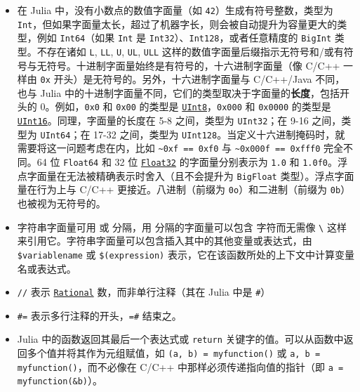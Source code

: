 \begin{itemize}
\item 在 Julia 中，没有小数点的数值字面量（如 \texttt{42}）生成有符号整数，类型为 \texttt{Int}，但如果字面量太长，超过了机器字长，则会被自动提升为容量更大的类型，例如 \texttt{Int64}（如果 \texttt{Int} 是 \texttt{Int32}）、\texttt{Int128}，或者任意精度的 \texttt{BigInt} 类型。不存在诸如 \texttt{L}, \texttt{LL}, \texttt{U}, \texttt{UL}, \texttt{ULL} 这样的数值字面量后缀指示无符号和/或有符号与无符号。十进制字面量始终是有符号的，十六进制字面量（像 C/C++ 一样由 \texttt{0x} 开头）是无符号的。另外，十六进制字面量与 C/C++/Java 不同，也与 Julia 中的十进制字面量不同，它们的类型取决于字面量的\textbf{长度}，包括开头的 0。例如，\texttt{0x0} 和 \texttt{0x00} 的类型是 \hyperlink{6609065134969660118}{\texttt{UInt8}}，\texttt{0x000} 和 \texttt{0x0000} 的类型是 \hyperlink{7018610346698168012}{\texttt{UInt16}}。同理，字面量的长度在 5-8 之间，类型为 \texttt{UInt32}；在 9-16 之间，类型为 \texttt{UInt64}；在 17-32 之间，类型为 \texttt{UInt128}。当定义十六进制掩码时，就需要将这一问题考虑在内，比如 \texttt{{\textasciitilde}0xf == 0xf0} 与 \texttt{{\textasciitilde}0x000f == 0xfff0} 完全不同。64 位 \texttt{Float64} 和 32 位 \hyperlink{8101639384272933082}{\texttt{Float32}} 的字面量分别表示为 \texttt{1.0} 和 \texttt{1.0f0}。浮点字面量在无法被精确表示时舍入（且不会提升为 \texttt{BigFloat} 类型）。浮点字面量在行为上与 C/C++ 更接近。八进制（前缀为 \texttt{0o}）和二进制（前缀为 \texttt{0b}）也被视为无符号的。


\item 字符串字面量可用 \texttt{{\textquotedbl}} 或 \texttt{{\textquotedbl}{\textquotedbl}{\textquotedbl}} 分隔，用 \texttt{{\textquotedbl}{\textquotedbl}{\textquotedbl}} 分隔的字面量可以包含 \texttt{{\textquotedbl}} 字符而无需像 \texttt{{\textquotedbl}{\textbackslash}{\textquotedbl}{\textquotedbl}} 这样来引用它。字符串字面量可以包含插入其中的其他变量或表达式，由 \texttt{\$variablename} 或 \texttt{\$(expression)} 表示，它在该函数所处的上下文中计算变量名或表达式。


\item \texttt{//} 表示 \hyperlink{8304566144531167610}{\texttt{Rational}} 数，而非单行注释（其在 Julia 中是 \texttt{\#}）


\item \texttt{\#=} 表示多行注释的开头，\texttt{=\#} 结束之。


\item Julia 中的函数返回其最后一个表达式或 \texttt{return} 关键字的值。可以从函数中返回多个值并将其作为元组赋值，如 \texttt{(a, b) = myfunction()} 或 \texttt{a, b = myfunction()}，而不必像在 C/C++ 中那样必须传递指向值的指针（即 \texttt{a = myfunction(\&b)}）。



\end{itemize}
